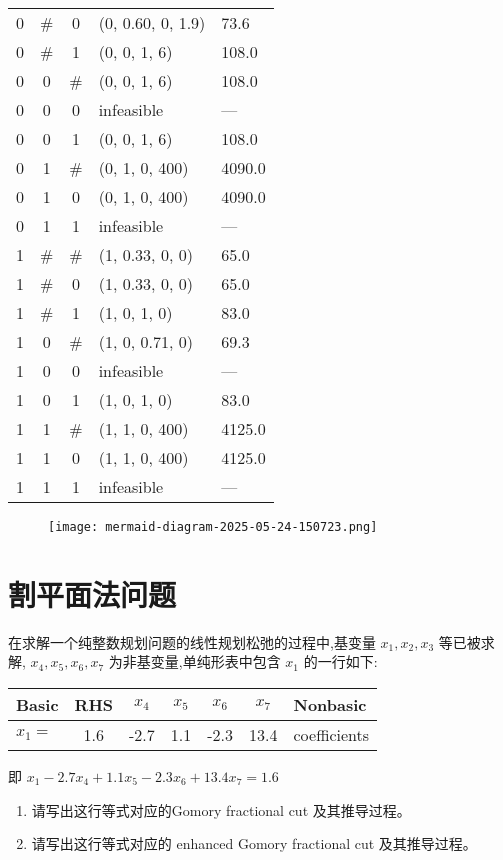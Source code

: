 \documentclass{article}
\begin{document}
\begin{longtable}{|c|c|c|l|l|}
0 & \# & 0 & (0, 0.60, 0, 1.9) & 73.6 \\
0 & \# & 1 & (0, 0, 1, 6) & 108.0 \\
0 & 0 & \# & (0, 0, 1, 6) & 108.0 \\
0 & 0 & 0 & infeasible & --- \\
0 & 0 & 1 & (0, 0, 1, 6) & 108.0 \\
0 & 1 & \# & (0, 1, 0, 400) & 4090.0 \\
0 & 1 & 0 & (0, 1, 0, 400) & 4090.0 \\
0 & 1 & 1 & infeasible & --- \\
1 & \# & \# & (1, 0.33, 0, 0) & 65.0 \\
1 & \# & 0 & (1, 0.33, 0, 0) & 65.0 \\
1 & \# & 1 & (1, 0, 1, 0) & 83.0 \\
1 & 0 & \# & (1, 0, 0.71, 0) & 69.3 \\
1 & 0 & 0 & infeasible & --- \\
1 & 0 & 1 & (1, 0, 1, 0) & 83.0 \\
1 & 1 & \# & (1, 1, 0, 400) & 4125.0 \\
1 & 1 & 0 & (1, 1, 0, 400) & 4125.0 \\
1 & 1 & 1 & infeasible & --- \\
\end{longtable}
\newpage

\begin{figure}[H]
    \centering
    \texttt{[image: mermaid-diagram-2025-05-24-150723.png]}
    \label{fig4}
\end{figure}

\newpage
\section*{割平面法问题}
在求解一个纯整数规划问题的线性规划松弛的过程中,基变量 $x_1, x_2, x_3$ 等已被求解, $x_4, x_5, x_6, x_7$ 为非基变量,单纯形表中包含 $x_1$ 的一行如下:
\begin{center}
\begin{tabular}{|l|c|c|c|c|c|l|}
\hline
Basic & RHS & $x_4$ & $x_5$ & $x_6$ & $x_7$ & Nonbasic \\ \hline
$x_1 = $ & 1.6 & -2.7 & 1.1 & -2.3 & 13.4 & coefficients \\ \hline
\end{tabular}
\end{center}
即 $x_{1}-2.7x_{4}+1.1x_{5}-2.3x_{6}+13.4x_{7}=1.6$
\begin{enumerate}
    \item 请写出这行等式对应的Gomory fractional cut 及其推导过程。
    \item 请写出这行等式对应的 enhanced Gomory fractional cut 及其推导过程。
\end{enumerate}
\end{document}
